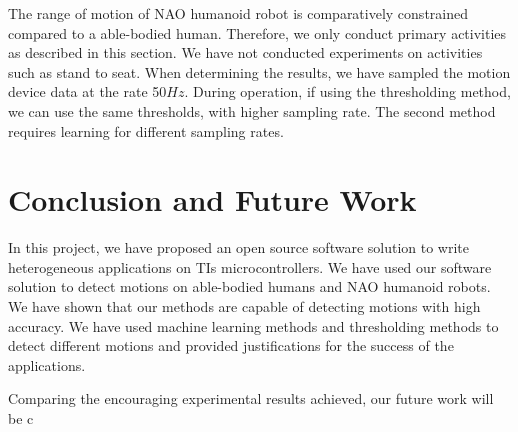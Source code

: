 \documentclass[letterpaper]{article}
\begin{document}
The range of motion of NAO humanoid robot is comparatively constrained compared to a able-bodied 
human. Therefore, we only conduct primary activities as described in this section. We have not 
conducted experiments on activities such as stand to seat. When determining the results, we 
have sampled the motion device data at the rate 50$Hz$. During operation, if using the 
thresholding method, we can use the same thresholds, with higher sampling rate. The second method 
requires learning for different sampling rates. 


\section{Conclusion and Future Work}

In this project, we have proposed an open source software solution to write heterogeneous
applications on TIs microcontrollers. We have used our software solution to detect motions on
able-bodied humans and NAO humanoid robots. We have shown that our methods are capable of detecting
motions with high accuracy. We have used machine learning methods and thresholding methods to
detect different motions and provided justifications for the success of the applications. 

\par
Comparing the encouraging experimental results achieved, our future work will be c



\end{document}
